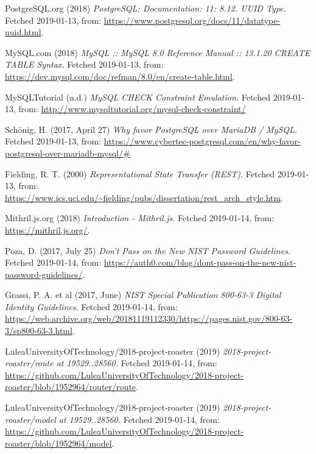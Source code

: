 \documentclass[12pt,a4paper]{report}
\begin{document}
{\begin{thebibliography}{1}
PostgreSQL.org (2018) {\em PostgreSQL: Documentation: 11: 8.12. UUID Type.} Fetched 2019-01-13, from: \url{https://www.postgresql.org/docs/11/datatype-uuid.html}.

MySQL.com (2018) {\em MySQL :: MySQL 8.0 Reference Manual :: 13.1.20 CREATE TABLE Syntax.} Fetched 2019-01-13, from: \url{https://dev.mysql.com/doc/refman/8.0/en/create-table.html}.

MySQLTutorial (n.d.) {\em MySQL CHECK Constraint Emulation.} Fetched 2019-01-13, from: \url{http://www.mysqltutorial.org/mysql-check-constraint/}

Schönig, H. (2017, April 27) {\em Why favor PostgreSQL over MariaDB / MySQL.} Fetched 2019-01-13, from:  \url{https://www.cybertec-postgresql.com/en/why-favor-postgresql-over-mariadb-mysql/#}

 Fielding, R. T. (2000) {\em Representational State Transfer (REST).} Fetched 2019-01-13, from: \url{https://www.ics.uci.edu/~fielding/pubs/dissertation/rest_arch_style.htm}.

 Mithril.js.org (2018) {\em Introduction - Mithril.js.} Fetched 2019-01-14, from: \url{https://mithril.js.org/}.

 Poza, D. (2017, July 25) {\em Don't Pass on the New NIST Password Guidelines.} Fetched 2019-01-14, from: \url{https://auth0.com/blog/dont-pass-on-the-new-nist-password-guidelines/}.

 Grassi, P. A. et al (2017, June) {\em NIST Special Publication 800-63-3 Digital Identity Guidelines.} Fetched 2019-01-14, from: \url{https://web.archive.org/web/20181119112330/https://pages.nist.gov/800-63-3/sp800-63-3.html}.

 LuleaUniversityOfTechnology/2018-project-roaster (2019) {\em 2018-project-roaster/route at 19529..28560.}
Fetched 2019-01-14, from:
\url{https://github.com/LuleaUniversityOfTechnology/2018-project-roaster/blob/1952964/router/route}.

 LuleaUniversityOfTechnology/2018-project-roaster (2019) {\em 2018-project-roaster/model at 19529..28560.}
Fetched 2019-01-14, from:
\url{https://github.com/LuleaUniversityOfTechnology/2018-project-roaster/blob/1952964/model}.

\end{thebibliography}}
\end{document}
